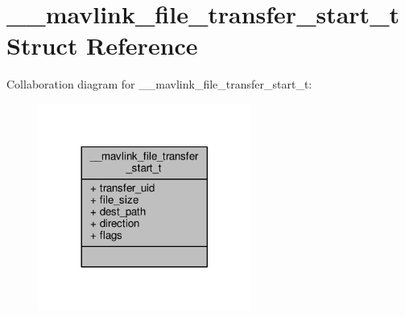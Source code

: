 \hypertarget{struct____mavlink__file__transfer__start__t}{\section{\+\_\+\+\_\+mavlink\+\_\+file\+\_\+transfer\+\_\+start\+\_\+t Struct Reference}
\label{struct____mavlink__file__transfer__start__t}
}


Collaboration diagram for \+\_\+\+\_\+mavlink\+\_\+file\+\_\+transfer\+\_\+start\+\_\+t\+:
\nopagebreak
\begin{figure}[H]
\begin{center}
\leavevmode
\includegraphics[width=197pt]{struct____mavlink__file__transfer__start__t__coll__graph}
\end{center}
\end{figure}

